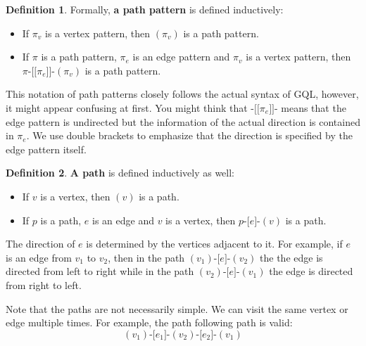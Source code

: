 \documentclass[14pt]{constructor-thesis}
\theoremstyle{definition}
\newtheorem*{definition}{Definition}
\newcommand{\pathstart}[1]{(#1)}
\newcommand{\pathhop}[3]{#1 \texttt{-[} #2 \texttt{]-} (#3)}
\newcommand{\patternstart}[1]{(#1)}
\newcommand{\patternhop}[3]{#1 \texttt{-[[} #2 \texttt{]]-} (#3)}
\begin{document}


\begin{definition}
  Formally, \textbf{a path pattern} is defined inductively:
  \begin{itemize}
    \item If $\pi_v$ is a vertex pattern, then $\patternstart{\pi_v}$ is a path pattern.
    \item If $\pi$ is a path pattern, $\pi_e$ is an edge pattern and $\pi_v$ is a vertex pattern, then $\patternhop{\pi}{\pi_e}{\pi_v}$ is a path pattern.
  \end{itemize}
\end{definition}

This notation of path patterns closely follows the actual syntax of GQL, however, it might appear confusing at first. You might think that $\texttt{-[[} \pi_e \texttt{]]-}$ means that the edge pattern is undirected but the information of the actual direction is contained in $\pi_e$. We use double brackets to emphasize that the direction is specified by the edge pattern itself.

\begin{definition}
  \textbf{A path} is defined inductively as well:
  \begin{itemize}
    \item If $v$ is a vertex, then $\pathstart{v}$ is a path.
    \item If $p$ is a path, $e$ is an edge and $v$ is a vertex, then $\pathhop{p}{e}{v}$ is a path.
  \end{itemize}
\end{definition}

The direction of $e$ is determined by the vertices adjacent to it. For example, if $e$ is an edge from $v_1$ to $v_2$, then in the path $\pathhop{\pathstart{v_1}}{e}{v_2}$ the the edge is directed from left to right while in the path $\pathhop{\pathstart{v_2}}{e}{v_1}$ the edge is directed from right to left.

Note that the paths are not necessarily simple. We can visit the same vertex or edge multiple times. For example, the path following path is valid:
$$\pathhop{\pathhop{\pathstart{v_1}}{e_1}{v_2}}{e_2}{v_1}$$
\end{document}
